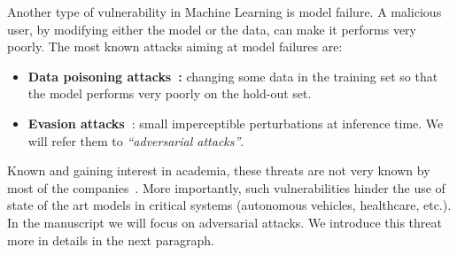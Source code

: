     
    
Another type of vulnerability in Machine Learning is model failure. A malicious user, by modifying either the model or the data, can make it performs very poorly. The most known attacks aiming at model failures are:
\begin{itemize}
    \item \textbf{Data poisoning attacks~\citep{kearns1993learning}:} changing some data in the training set so that the model performs very poorly on the hold-out set. 
    \item \textbf{Evasion attacks~\citep{biggio2013evasion,Szegedy2013IntriguingPO}}: small imperceptible perturbations at inference time. We will refer them to \emph{``adversarial attacks''}.
\end{itemize}
    
Known and gaining interest in academia, these threats are not very known by most of the companies~\citep{kumar2020adversarial}. More importantly, such vulnerabilities  hinder the use of state of the art models in critical systems (autonomous vehicles, healthcare, etc.). In the manuscript we will focus on adversarial attacks.  We introduce this threat more in details in the next paragraph.

